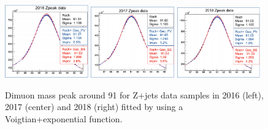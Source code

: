 \begin{figure}[h!]
    \centering
    \includegraphics[width=0.32\textwidth]{images_geofit/DY_data_mass_geofit_2016.png}
    \includegraphics[width=0.32\textwidth]{images_geofit/DY_data_mass_geofit_2017.png}
    \includegraphics[width=0.32\textwidth]{images_geofit/DY_data_mass_geofit_2018.png}
    \caption{Dimuon mass peak around 91 \gev for Z+jets data samples in 2016 (left), 2017 (center) and 2018 (right) fitted by using a Voigtian+exponential function.}
    \label{fig:dimu_mass_DY_data}
\end{figure}

